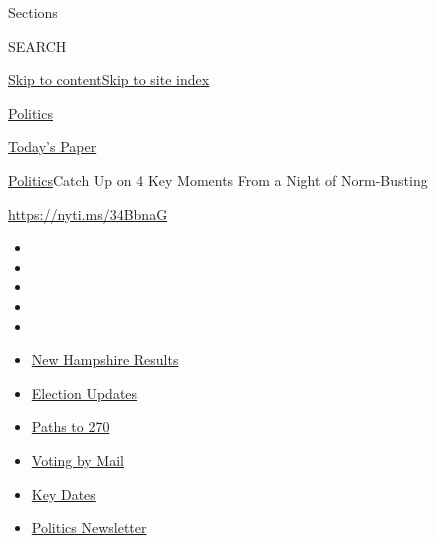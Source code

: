 Sections

SEARCH

\protect\hyperlink{site-content}{Skip to
content}\protect\hyperlink{site-index}{Skip to site index}

\href{https://www.nytimes3xbfgragh.onion/section/politics}{Politics}

\href{https://myaccount.nytimes3xbfgragh.onion/auth/login?response_type=cookie\&client_id=vi}{}

\href{https://www.nytimes3xbfgragh.onion/section/todayspaper}{Today's
Paper}

\href{/section/politics}{Politics}\textbar{}Catch Up on 4 Key Moments
From a Night of Norm-Busting

\url{https://nyti.ms/34BbnaG}

\begin{itemize}
\item
\item
\item
\item
\item
\end{itemize}

\begin{itemize}
\item
  \href{https://www.nytimes3xbfgragh.onion/interactive/2020/09/08/us/elections/results-new-hampshire-primary-elections.html?action=click\&pgtype=Article\&state=default\&region=TOP_BANNER\&context=storylines_menu}{New
  Hampshire Results}
\item
  \href{https://www.nytimes3xbfgragh.onion/live/2020/09/08/us/trump-vs-biden?action=click\&pgtype=Article\&state=default\&region=TOP_BANNER\&context=storylines_menu}{Election
  Updates}
\item
  \href{https://www.nytimes3xbfgragh.onion/interactive/2020/us/elections/election-states-biden-trump.html?action=click\&pgtype=Article\&state=default\&region=TOP_BANNER\&context=storylines_menu}{Paths
  to 270}
\item
  \href{https://www.nytimes3xbfgragh.onion/interactive/2020/08/31/us/politics/vote-by-mail-deadlines.html?action=click\&pgtype=Article\&state=default\&region=TOP_BANNER\&context=storylines_menu}{Voting
  by Mail}
\item
  \href{https://www.nytimes3xbfgragh.onion/interactive/2019/us/elections/2020-presidential-election-calendar.html?action=click\&pgtype=Article\&state=default\&region=TOP_BANNER\&context=storylines_menu}{Key
  Dates}
\item
  \href{https://www.nytimes3xbfgragh.onion/newsletters/politics?action=click\&pgtype=Article\&state=default\&region=TOP_BANNER\&context=storylines_menu}{Politics
  Newsletter}
\end{itemize}

